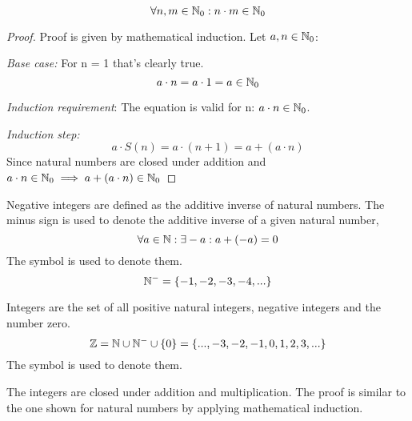 \begin{theorem}
    \begin{equation}
        \forall n,m \in \mathbb{N}_0: n \cdot m \in \mathbb{N}_0
    \end{equation}
\end{theorem}
\begin{proof}
    Proof is given by mathematical induction.
    Let $a,n \in \mathbb{N}_0$:

    \emph{Base case:} For n = 1 that's clearly true.
    \begin{equation}
        a \cdot n = a \cdot 1 = a \in \mathbb{N}_0
    \end{equation}

    \emph{Induction requirement}: The equation is valid for n: $a \cdot n \in \mathbb{N}_0$.
    
    \emph{Induction step:} 
    \begin{equation}
        a \cdot S(n) = a \cdot (n + 1) = a + (a \cdot n)
    \end{equation}
    Since natural numbers are closed under addition and 
    $a \cdot n \in \mathbb{N}_0 \implies a + (a \cdot n) \in \mathbb{N}_0$
\end{proof}

\begin{definition}
    Negative integers are defined as the additive inverse of natural numbers.
    The minus sign is used to denote the additive inverse of a given natural number,
    \begin{equation}
        \forall a \in \mathbb{N}: \exists -a: a + (-a) = 0
    \end{equation}
    The symbol \Nminus{} is used to denote them.
    \begin{equation}
        \mathbb{N}^- = \{-1, -2, -3, -4, ... \}
    \end{equation}
\end{definition}

\begin{definition}[Integers]
    Integers are the set of all positive natural integers, negative integers and the number zero.
    \begin{equation}
        \mathbb{Z} = \mathbb{N} \cup \mathbb{N}^- \cup \{0 \} =  \{...,-3,-2,-1,0,1,2,3,... \}
    \end{equation}
    The symbol \Z{} is used to denote them.
\end{definition}

\begin{corollary}
    The integers \Z{} are closed under addition and multiplication.
    The proof is similar to the one shown for natural numbers by applying mathematical induction. 
\end{corollary}

